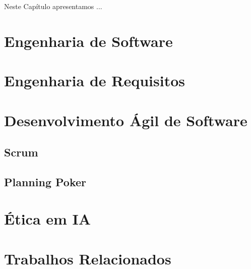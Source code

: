 \label{referencial}

Neste Capítulo apresentamos ...

\section{Engenharia de Software}


\section{Engenharia de Requisitos}


\section{Desenvolvimento Ágil de Software}

\subsection{Scrum}

\subsection{Planning Poker}

\section{Ética em IA}



\section{Trabalhos Relacionados}
